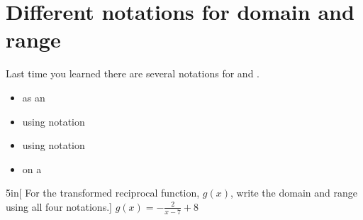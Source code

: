 \section{Different notations for domain and range}

Last time you learned 
there are several notations for  and .
\begin{itemize}[nosep]
    \item as an 
    \item using  notation
    \item using  notation
    \item on a 
\end{itemize}

\begin{myWideProblem}{5in}[%
    For the transformed reciprocal function, $g(x)$, write the domain and range 
    using all four notations.]
    {
        $g(x) = - \frac{2}{x-7} + 8$
    }
\end{myWideProblem}



